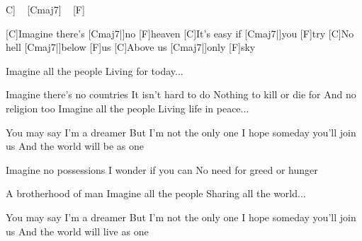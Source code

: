 
\begin{guitar}

C] ~ [Cmaj7]  ~ [F]  ~  %

[C]Imagine there's [Cmaj7|]{no} [F]heaven
[C]It's easy if [Cmaj7|]{you} [F]try
[C]No hell [Cmaj7|]{below} [F]us
[C]Above us [Cmaj7|]{only} [F]sky


Imagine all the people
Living for today...

Imagine there's no countries
It isn't hard to do
Nothing to kill or die for
And no religion too
Imagine all the people
Living life in peace...

You may say I'm a dreamer
But I'm not the only one
I hope someday you'll join us
And the world will be as one

Imagine no possessions
I wonder if you can
No need for greed or hunger

A brotherhood of man
Imagine all the people
Sharing all the world...

You may say I'm a dreamer
But I'm not the only one
I hope someday you'll join us
And the world will live as one

\end{guitar}